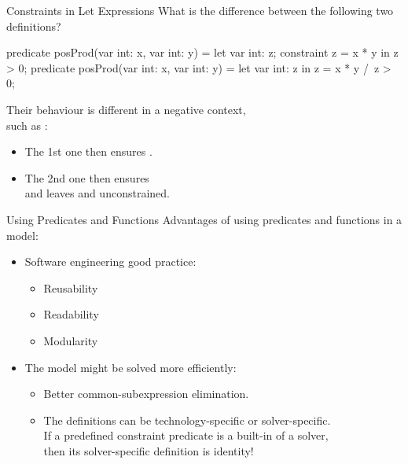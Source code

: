 \documentclass{cons-beamer}
\begin{document}
\begin{flashcardminizinc}
\begin{frame}[fragile]{Constraints in Let Expressions}
  What is the difference between the following two definitions?
  \begin{mzn}
predicate posProd(var int: x, var int: y) =
  let { var int: z; constraint z = x * y
  } in z > 0;
predicate posProd(var int: x, var int: y) =
  let { var int: z
  } in z = x * y /\ z > 0;
  \end{mzn}
  Their behaviour is different in a negative context, \\ such as
  :
  \begin{itemize}
  \item The 1st one then ensures .
  \item The 2nd one then ensures  \\
    and leaves  and  unconstrained.
  \end{itemize}
\end{frame}

\begin{frame}{Using Predicates and Functions}
  Advantages of using predicates and functions in a model: \vfill
  \begin{itemize}
  \item Software engineering good practice: \vfill
    \begin{itemize}
    \item Reusability \vfill
    \item Readability \vfill
    \item Modularity
    \end{itemize}\vfill
  \item The model might be solved more efficiently: \vfill
    \begin{itemize}
    \item Better common-subexpression elimination. \vfill
    \item The definitions can be technology-specific or
      solver-specific. \\ If a predefined constraint predicate is a
      built-in of a solver, \\ then its solver-specific definition is
      identity!
    \end{itemize}
  \end{itemize}
\end{frame}


\end{flashcardminizinc}
\end{document}
